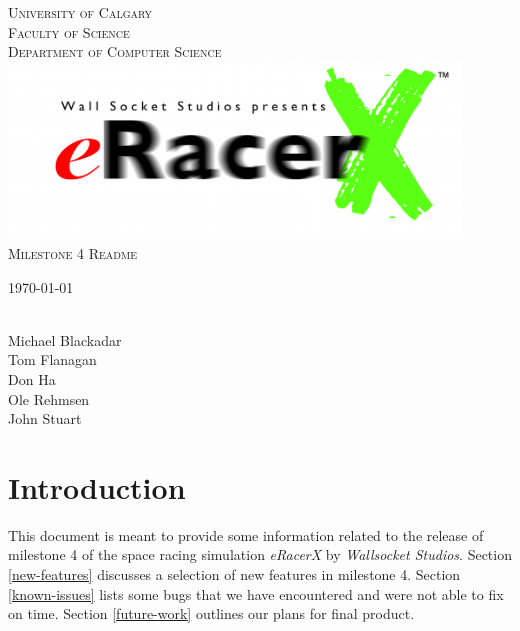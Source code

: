 \documentclass[11pt]{article}
\begin{document}
\begin{titlepage}
\begin{center}
\textsc{
%
University of Calgary\\
Faculty of Science\\
Department of Computer Science\\ 
}
\vspace{3cm}
%
%
{
\includegraphics[width=12cm]{img/eRacerX-Logo.png}\\
\textsc{
\Huge
Milestone 4 Readme
}
}
\vspace{5mm}


\vspace{5mm}
{
 \today \\
 \ \\
 }
%
\vfill %
%
%
\begin{flushright} 
Michael Blackadar \\
\vspace{3mm}
Tom Flanagan\\
\vspace{3mm}
Don Ha\\
\vspace{3mm}
Ole Rehmsen\\
\vspace{3mm}
John Stuart
\end{flushright}



\end{center}
\end{titlepage}

\label{introduction}
\section{Introduction}

This document is meant to provide some information related to the release of milestone 4 of the space racing simulation \emph{eRacerX} by \emph{Wallsocket Studios}. Section \ref{new-features} discusses a selection of new features in milestone 4. Section \ref{known-issues} lists some bugs that we have encountered and were not able to fix on time. Section \ref{future-work} outlines our plans for final product.
\end{document}

